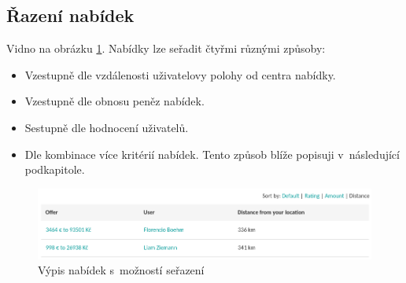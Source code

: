 \subsection{Řazení nabídek}
Vidno na obrázku \ref{fig:tur:sorting}. Nabídky lze seřadit čtyřmi různými způsoby:
\begin{itemize}
	\item Vzestupně dle vzdálenosti uživatelovy polohy od centra nabídky.
	\item Vzestupně dle obnosu peněz nabídek.
	\item Sestupně dle hodnocení uživatelů.
	\item Dle kombinace více kritérií nabídek. Tento způsob blíže popisuji v~následující podkapitole.
\end{itemize}

\begin{figure}[!h]
    \centering
    \includegraphics[width=1.0\textwidth]{media/tur/sorting.png}
    \caption{Výpis nabídek s~možností seřazení}
    \label{fig:tur:sorting}
\end{figure}

